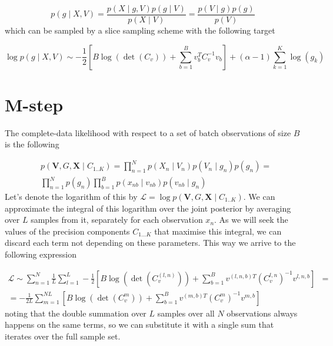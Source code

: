 \documentclass{paper}
\begin{document}
\begin{equation} 
p(g \mid X,V) = \frac{p(X \mid g,V) p(g \mid V)}{p(X \mid V)} = \frac{p(V \mid g) p(g)}{p(V)}
\end{equation}
%
which can be sampled by a  slice sampling scheme with the following target

\begin{equation} 
\log p(g \mid X,V) \sim -\frac{1}{2} \left[B\log(\det(C_v)) + \sum_{b=1}^B v_b^T C_v^{-1} v_b\right] + (\alpha-1) \sum_{k=1}^K \log(g_k)
\end{equation}

\section{M-step}

The complete-data likelihood with respect to a set of batch observations of size $B$ is the following

\begin{equation}
\begin{split}
&p(\mathbf{V},G,\mathbf{X} \mid C_{1..K}) = \prod_{n=1}^N p(X_n \mid V_n) p(V_n \mid g_n) p(g_n) = \\
&\prod_{n=1}^N p(g_n) \prod_{b=1}^B p(x_{nb} \mid v_{nb}) p(v_{nb} \mid g_n) 
\end{split}
\end{equation}
%
Let's denote the logarithm of this by $\mathcal{L}=\log p(\mathbf{V},G,\mathbf{X} \mid C_{1..K})$. We can approximate the integral of this logarithm over the joint posterior by averaging over $L$ samples from it, separately for each observation $x_n$. As we will seek the values of the precision components $C_{1 \dots K}$ that maximise this integral, we can discard each term not depending on these parameters. This way we arrive to the following expression 

\begin{equation}
\begin{split}
\mathcal{L} \sim \sum_{n=1}^N \frac{1}{L} \sum_{l=1}^L -\frac{1}{2} \left[B \log \left( \det \left( C_v^{(l,n)} \right) \right) + \sum_{b=1}^B v^{(l,n,b)T}  \left( C_v^{l,n} \right)^{-1} v^{l,n,b}\right]& = \\
= -\frac{1}{2L} \sum_{m=1}^{NL} \left[B \log \left( \det \left( C_v^{m} \right) \right) + \sum_{b=1}^B v^{(m,b)T}  \left( C_v^{m} \right)^{-1} v^{m,b}\right]&
\end{split}
\end{equation}
%
noting that the double summation over $L$ samples over all $N$ observations always happens on the same terms, so we can substitute it with a single sum that iterates over the full sample set.
\end{document}

